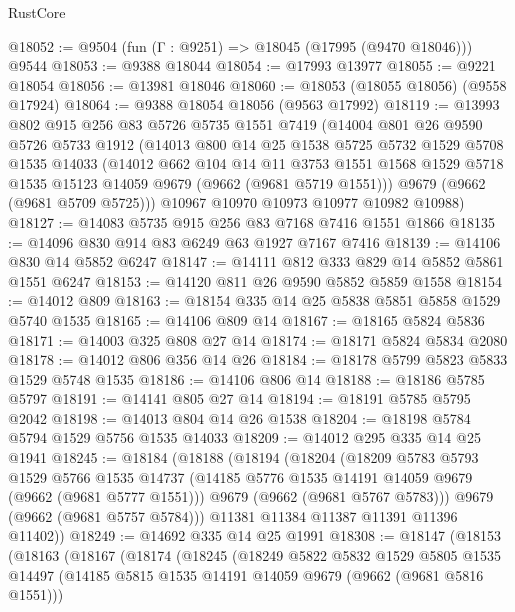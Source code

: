 \begin{lexlean}{RustCore}
\begin{coremodule}
@18052 := @9504 (fun (Γ : @9251) => @18045 (@17995 (@9470 @18046))) @9544
@18053 := @9388 @18044
@18054 := @17993 @13977
@18055 := @9221 @18054
@18056 := @13981 @18046
@18060 := @18053 (@18055 @18056) (@9558 @17924)
@18064 := @9388 @18054 @18056 (@9563 @17992)
@18119 := @13993
    @802
    @915
    @256
    @83
    @5726
    @5735
    @1551
    @7419
    (@14004
      @801
      @26
      @9590
      @5726
      @5733
      @1912
      (@14013
        @800
        @14
        @25
        @1538
        @5725
        @5732
        @1529
        @5708
        @1535
        @14033
        (@14012
          @662
          @104
          @14
          @11
          @3753
          @1551
          @1568
          @1529
          @5718
          @1535
          @15123
          @14059
          @9679
          (@9662 (@9681 @5719 @1551)))
        @9679
        (@9662 (@9681 @5709 @5725)))
      @10967
      @10970
      @10973
      @10977
      @10982
      @10988)
@18127 := @14083 @5735 @915 @256 @83 @7168 @7416 @1551 @1866
@18135 := @14096 @830 @914 @83 @6249 @63 @1927 @7167 @7416
@18139 := @14106 @830 @14 @5852 @6247
@18147 := @14111 @812 @333 @829 @14 @5852 @5861 @1551 @6247
@18153 := @14120 @811 @26 @9590 @5852 @5859 @1558
@18154 := @14012 @809
@18163 := @18154 @335 @14 @25 @5838 @5851 @5858 @1529 @5740 @1535
@18165 := @14106 @809 @14
@18167 := @18165 @5824 @5836
@18171 := @14003 @325 @808 @27 @14
@18174 := @18171 @5824 @5834 @2080
@18178 := @14012 @806 @356 @14 @26
@18184 := @18178 @5799 @5823 @5833 @1529 @5748 @1535
@18186 := @14106 @806 @14
@18188 := @18186 @5785 @5797
@18191 := @14141 @805 @27 @14
@18194 := @18191 @5785 @5795 @2042
@18198 := @14013 @804 @14 @26 @1538
@18204 := @18198 @5784 @5794 @1529 @5756 @1535 @14033
@18209 := @14012 @295 @335 @14 @25 @1941
@18245 := @18184
    (@18188
      (@18194
        (@18204
          (@18209
            @5783
            @5793
            @1529
            @5766
            @1535
            @14737
            (@14185 @5776 @1535 @14191 @14059 @9679 (@9662 (@9681 @5777 @1551)))
            @9679
            (@9662 (@9681 @5767 @5783)))
          @9679
          (@9662 (@9681 @5757 @5784)))
        @11381
        @11384
        @11387
        @11391
        @11396
        @11402))
@18249 := @14692 @335 @14 @25 @1991
@18308 := @18147
    (@18153
      (@18163
        (@18167
          (@18174
            (@18245
              (@18249
                @5822
                @5832
                @1529
                @5805
                @1535
                @14497
                (@14185 @5815 @1535 @14191 @14059 @9679 (@9662 (@9681 @5816 @1551)))

\end{coremodule}
\end{lexlean}
